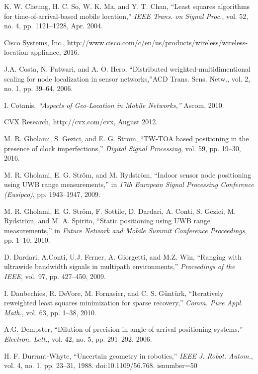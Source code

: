 \begin{thebibliography}{99}
 \label{r9}
K. W. Cheung, H. C. So, W. K. Ma, and Y. T. Chan, ``Least squares algorithms for time-of-arrival-based mobile location,'' {\em IEEE Trans. on Signal Proc.}, vol. 52, no. 4, pp. 1121--1228, Apr. 2004.

Cisco Systems, Inc., http://www.cisco.com/c/en/us/products/wireless/wireless-location-appliance, 2016.


J.A. Costa, N. Patwari, and A. O. Hero, ``Distributed weighted-multidimentional scaling for node localization in sensor networks,''ACD Trans. Sens. Netw., vol. 2, no. 1, pp. 39--64, 2006.

I. Cotanis, {\em ``Aspects of Geo-Location in Mobile Networks,''} Ascom, 2010.

CVX Research, http://cvx.com/cvx, August 2012.

M. R. Gholami, S. Gezici, and E. G. Str\"om, ``TW-TOA based positioning in the presence of clock imperfections,'' {\em  Digital Signal Processing}, vol. 59, pp. 19--30, 2016.

M. R. Gholami, E. G. Str\"om, and M. Rydstr\"om, ``Indoor sensor node positioning using UWB range measurements,'' in {\em 17th European Signal Processing Conference (Eusipco)}, pp. 1943--1947, 2009.

M. R. Gholami, E. G. Str\"om, F. Sottile, D. Dardari, A. Conti, S. Gezici, M. Rydstr\"om, and M. A. Spirito, ``Static positioning using UWB range measurements,'' in {\em Future Network and Mobile Summit Conference Proceedings}, %
pp. 1--10, 2010.


D. Dardari, A.Conti, U.J. Ferner, A. Giorgetti, and M.Z. Win, ``Ranging with ultrawide bandwidth signals in multipath environments,'' {\em Proceedings of the IEEE}, vol. 97, pp. 427--450, 2009.

I. Daubechies, R. DeVore, M. Fornasier, and C. S. G\"unt\"urk, ``Iteratively reweighted least squares minimization for sparse recovery,'' {\em Comm. Pure Appl. Math.}, vol. 63, pp. 1--38, 2010.

A.G. Dempster, ``Dilution of precision in angle-of-arrival positioning systems,'' {\em Electron. Lett.}, vol. 42, no. 5, pp. 291--292, 2006.

H. F. Durrant-Whyte, ``Uncertain geometry in robotics,'' {\em IEEE J. Robot. Autom.}, vol. 4, no. 1, pp. 23--31, 1988. doi:10.1109/56.768. %
isnumber=50


\end{thebibliography}
